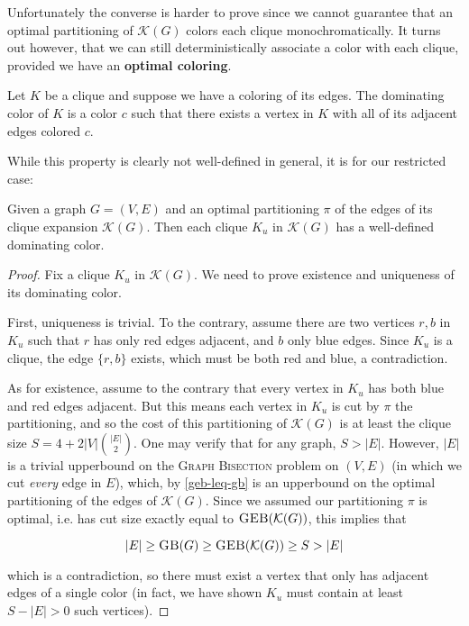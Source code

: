 \documentclass{article}
\newcommand{\gb}{\textsc{Graph \allowbreak Bisection} }
\newcommand{\sgeb}{\textsc{GEB} }
\newcommand{\sgb}{\textsc{GB} }
\begin{document}
	Unfortunately the converse is harder to prove since we cannot guarantee
	that an optimal partitioning of $\mathcal{K}(G)$ colors each clique
	monochromatically. It turns
	out however, that we can still deterministically associate a color with
	each clique, provided we have an \textbf{optimal coloring}.

	\begin{definition}
		Let $K$ be a clique and suppose we have a coloring of its edges. The
		dominating color of $K$ is a color $c$ such that there exists a vertex
		in $K$ with all of its adjacent edges colored $c$.
	\end{definition}

	While this property is clearly not well-defined in general, it is for our
	restricted case:

	\begin{lemma}
		\label{dom-col}
		Given a graph $G = (V, E)$ and an optimal partitioning $\pi$
		of the edges of its clique
		expansion $\mathcal{K}(G)$. Then each clique $K_u$ in $\mathcal{K}(G)$
		has a well-defined dominating color.
	\end{lemma}
	\begin{proof}
		Fix a clique $K_u$ in $\mathcal{K}(G)$. We need to prove existence and
		uniqueness of its dominating color.

		First, uniqueness is trivial. To the contrary, assume there are two
		vertices $r, b$ in $K_u$ such that $r$ has only red edges adjacent,
		and $b$ only blue edges. Since $K_u$ is a clique, the edge $\{r, b\}$
		exists, which must be both red and blue, a contradiction.

		As for existence, assume to the contrary that every vertex in $K_u$
		has both blue and red edges adjacent. But this means each vertex in
		$K_u$ is cut by $\pi$ the partitioning, and so the cost of
		this partitioning of $\mathcal{K}(G)$ is at least the clique size
		$S = 4+2|V|\binom{|E|}{2}$. One may verify that for any graph,
		$S > |E|$. However, $|E|$ is a trivial upperbound on the \gb problem
		on $(V, E)$ (in which we cut \textit{every} edge in $E$),
		which, by \autoref{geb-leq-gb} is an upperbound on the optimal
		partitioning of the edges of $\mathcal{K}(G)$. Since we assumed our
		partitioning $\pi$ is optimal, i.e. has cut size
		exactly equal to $\sgeb(\mathcal{K}(G))$, this implies that

		$$|E| \geq \sgb(G) \geq \sgeb(\mathcal{K}(G)) \geq S > |E|$$

		which is a contradiction, so there must exist a vertex that only has
		adjacent edges of a single color (in fact, we have shown $K_u$ must
		contain at least $S - |E| > 0$ such vertices).
	\end{proof}
\end{document}
